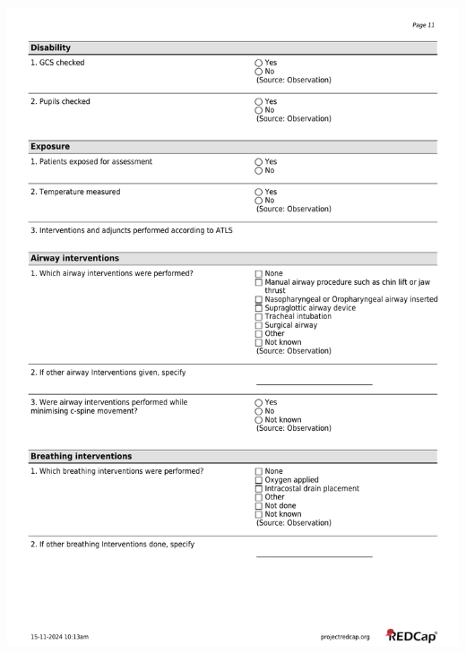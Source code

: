 \documentclass[
]{scrartcl}
\begin{document}
\includegraphics{../case-record-form/instrument-pdfs/pages/all-instruments-11.pdf}
\end{document}
